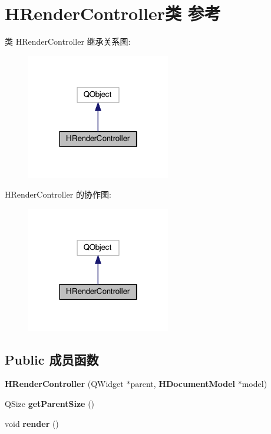 \section{H\+Render\+Controller类 参考}
\label{class_h_render_controller}


类 H\+Render\+Controller 继承关系图\+:\nopagebreak
\begin{figure}[H]
\begin{center}
\leavevmode
\includegraphics[width=178pt]{class_h_render_controller__inherit__graph}
\end{center}
\end{figure}


H\+Render\+Controller 的协作图\+:\nopagebreak
\begin{figure}[H]
\begin{center}
\leavevmode
\includegraphics[width=178pt]{class_h_render_controller__coll__graph}
\end{center}
\end{figure}
\subsection*{Public 成员函数}
\begin{DoxyCompactItemize}
\item 
{\bfseries H\+Render\+Controller} (Q\+Widget $\ast$parent, {\bf H\+Document\+Model} $\ast$model)\label{class_h_render_controller_a5210b856b3f8094f63a52a09a6a2c116}

\item 
Q\+Size {\bfseries get\+Parent\+Size} ()\label{class_h_render_controller_a4420f173f24eeca5566e131f21c51c95}

\item 
void {\bfseries render} ()\label{class_h_render_controller_a2d45a5eaa444032f1625f23ed923a349}

\end{DoxyCompactItemize}


